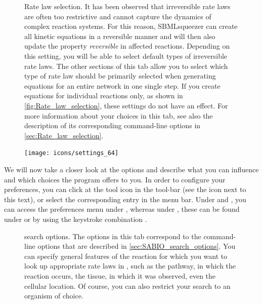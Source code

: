 \begin{figure}
\caption[Rate law selection]{Rate law selection.
It has been observed that irreversible rate laws are
often too restrictive and cannot capture the dynamics of complex reaction systems.
For this reason, SBMLsqueezer can create all kinetic equations in a reversible manner
and will then also update the property \emph{reversible} in affected reactions.
Depending on this setting, you will be able to select default types of irreversible
rate laws.
The other sections of this tab allow you to select which type of rate law should
be primarily selected when generating equations for an entire network in one single
step.
If you create equations for individual reactions only, as shown in \vref{fig:Rate_law_selection},
these settings do not have an effect.  
For more information about your choices in this tab, see also the description of
its corresponding command-line options in \vref{sec:Rate_law_selection}.}
\label{fig:Rate_law_selection}
\end{figure}
\begin{figure}
\vspace{\wrapfigspace}
\texttt{[image: icons/settings\_64]}
\end{figure}
We will now take a closer look at the options and describe what you can influence
and which choices the program offers to you.
In order to configure your preferences, you can click at the tool icon in the
tool-bar (see the icon next to this text), or select the corresponding entry in the menu bar.
Under \Windows and \Linux, you can access the preferences menu under
, whereas
under \MacOSX, these can be found under  or by using the keystroke
combination \keys{\cmd + {$,$}}.
\begin{figure}
\caption[\SABIO search options]{\SABIO search options.
The options in this tab correspond to the command-line options that are described
in \vref{sec:SABIO_search_options}.
You can specify general features of the reaction for which you want to look up
appropriate rate laws in \SABIO, such as the pathway, in which the reaction
occurs, the tissue, in which it was observed, even the cellular location.
Of course, you can also restrict your search to an organism of choice.}
\label{fig:SABIO-RK_search_options}
\end{figure}
